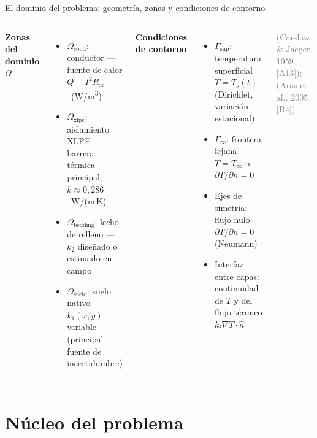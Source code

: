 \documentclass[aspectratio=169]{beamer}
\newcommand{\refcite}[1]{{\footnotesize\color{gray!70!black} #1}}
\begin{document}
\begin{frame}{El dominio del problema: geometría, zonas y condiciones de contorno}
\begin{columns}[T]
\justifying\small
\textbf{Zonas del dominio $\Omega$}
\begin{itemize}[leftmargin=*]\scriptsize
    \item $\Omega_\text{cond}$: conductor --- fuente de calor
          $Q = I^2 R_\text{ac}$~(W/m\textsuperscript{3})
    \item $\Omega_\text{xlpe}$: aislamiento XLPE --- barrera térmica
          principal; $k\approx 0{,}286$~W/(m\,K)
    \item $\Omega_\text{bedding}$: lecho de relleno --- $k_2$
          diseñado o estimado en campo
    \item $\Omega_\text{suelo}$: suelo nativo --- $k_1(x,y)$ variable
          (principal fuente de incertidumbre)
\end{itemize}
\vspace{0.25em}
\textbf{Condiciones de contorno}
\begin{itemize}[leftmargin=*]\scriptsize
    \item $\Gamma_\text{sup}$: temperatura superficial
          $T = T_s(t)$ (Dirichlet, variación estacional)
    \item $\Gamma_\infty$: frontera lejana ---
          $T = T_\infty$ o $\partial T/\partial n = 0$
    \item Ejes de simetría:
          flujo nulo $\partial T/\partial n = 0$ (Neumann)
    \item Interfaz entre capas: continuidad de $T$ y del
          flujo térmico $k_i\nabla T\cdot\hat{n}$
\end{itemize}
\vspace{0.15em}
\textcolor{gray}{\scriptsize\refcite{(Carslaw \& Jaeger, 1959 [A13]);
(Aras et al., 2005 [R4])}}
\end{columns}
\end{frame}

\section{Núcleo del problema}
\end{document}
